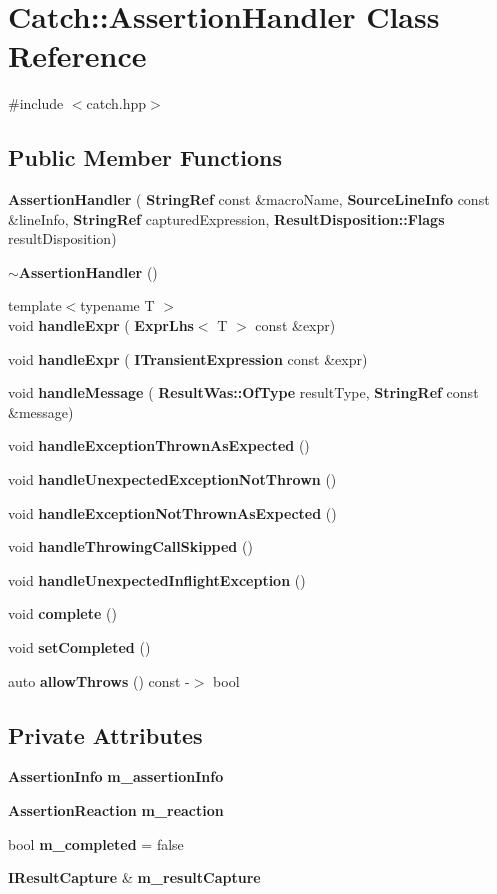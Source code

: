 \section{Catch\+::Assertion\+Handler Class Reference}
\label{class_catch_1_1_assertion_handler}


{\ttfamily \#include $<$catch.\+hpp$>$}

\subsection*{Public Member Functions}
\begin{DoxyCompactItemize}
\item 
\textbf{ Assertion\+Handler} (\textbf{ String\+Ref} const \&macro\+Name, \textbf{ Source\+Line\+Info} const \&line\+Info, \textbf{ String\+Ref} captured\+Expression, \textbf{ Result\+Disposition\+::\+Flags} result\+Disposition)
\item 
\textbf{ $\sim$\+Assertion\+Handler} ()
\item 
{\footnotesize template$<$typename T $>$ }\\void \textbf{ handle\+Expr} (\textbf{ Expr\+Lhs}$<$ T $>$ const \&expr)
\item 
void \textbf{ handle\+Expr} (\textbf{ I\+Transient\+Expression} const \&expr)
\item 
void \textbf{ handle\+Message} (\textbf{ Result\+Was\+::\+Of\+Type} result\+Type, \textbf{ String\+Ref} const \&message)
\item 
void \textbf{ handle\+Exception\+Thrown\+As\+Expected} ()
\item 
void \textbf{ handle\+Unexpected\+Exception\+Not\+Thrown} ()
\item 
void \textbf{ handle\+Exception\+Not\+Thrown\+As\+Expected} ()
\item 
void \textbf{ handle\+Throwing\+Call\+Skipped} ()
\item 
void \textbf{ handle\+Unexpected\+Inflight\+Exception} ()
\item 
void \textbf{ complete} ()
\item 
void \textbf{ set\+Completed} ()
\item 
auto \textbf{ allow\+Throws} () const -\/$>$ bool
\end{DoxyCompactItemize}
\subsection*{Private Attributes}
\begin{DoxyCompactItemize}
\item 
\textbf{ Assertion\+Info} \textbf{ m\+\_\+assertion\+Info}
\item 
\textbf{ Assertion\+Reaction} \textbf{ m\+\_\+reaction}
\item 
bool \textbf{ m\+\_\+completed} = false
\item 
\textbf{ I\+Result\+Capture} \& \textbf{ m\+\_\+result\+Capture}
\end{DoxyCompactItemize}


